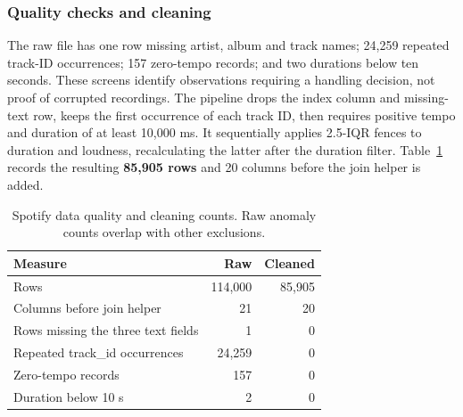 \documentclass[12pt, a4paper]{article}
\begin{document}
\subsubsection{Quality checks and cleaning}
The raw file has one row missing artist, album and track names; 24,259 repeated track-ID occurrences; 157 zero-tempo records; and two durations below ten seconds. These screens identify observations requiring a handling decision, not proof of corrupted recordings. The pipeline drops the index column and missing-text row, keeps the first occurrence of each track ID, then requires positive tempo and duration of at least 10,000 ms. It sequentially applies 2.5-IQR fences to duration and loudness, recalculating the latter after the duration filter. Table~\ref{tab:spotify-cleaning} records the resulting \textbf{85,905 rows} and 20 columns before the join helper is added.
\begin{table}[htbp]
\centering\small
\setlength{\tabcolsep}{4pt}\renewcommand{\arraystretch}{1.12}
\caption{Spotify data quality and cleaning counts. Raw anomaly counts overlap with other exclusions.}
\label{tab:spotify-cleaning}
\begin{tabular}{p{.58\linewidth}rr}
\toprule
\raggedright \textbf{Measure} & \textbf{Raw} & \textbf{Cleaned} \tabularnewline
\midrule
\raggedright Rows & 114,000 & 85,905 \tabularnewline
\raggedright Columns before join helper & 21 & 20 \tabularnewline
\raggedright Rows missing the three text fields & 1 & 0 \tabularnewline
\raggedright Repeated track\_id occurrences & 24,259 & 0 \tabularnewline
\raggedright Zero-tempo records & 157 & 0 \tabularnewline
\raggedright Duration below 10 s & 2 & 0 \tabularnewline
\bottomrule
\end{tabular}
\end{table}
\end{document}
